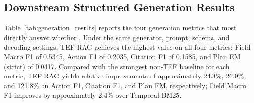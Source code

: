 \subsection{Downstream Structured Generation Results}
\label{sec:generation_results}

Table~\ref{tab:generation_results} reports the four generation metrics that most directly answer whether .
Under the same generator, prompt, schema, and decoding settings, TEF-RAG achieves the highest value on all four metrics:
Field Macro F1 of 0.5345, Action F1 of 0.2035, Citation F1 of 0.1585, and Plan EM (strict) of 0.0417.
Compared with the strongest non-TEF baseline for each metric, TEF-RAG yields relative improvements of approximately 24.3\%, 26.9\%, and 121.8\% on Action F1, Citation F1, and Plan EM, respectively; Field Macro F1 improves by approximately 2.4\% over Temporal-BM25.

\begin{table}[t]
\caption{Primary structured-generation metrics on the generation test set.}
\label{tab:generation_results}
\centering
\small
\setlength{\tabcolsep}{3pt}
\end{table}


